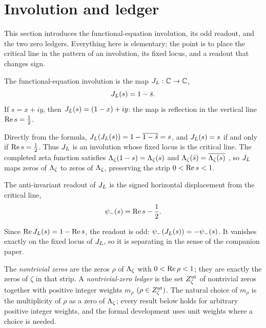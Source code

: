 \section{Involution and ledger}
\label{sec:involution_and_ledger}

This section introduces the functional-equation involution, its odd
readout, and the two zero ledgers.  Everything here is elementary; the
point is to place the critical line in the pattern of an involution,
its fixed locus, and a readout that changes sign.

\begin{definition}
\label{def:rh:fe-involution}
The functional-equation involution is the map
\(J_{L}:\mathbb C\to\mathbb C\),
\[
  J_{L}(s)=1-\bar s .
\]
If \(s=x+iy\), then \(J_{L}(s)=(1-x)+iy\): the map is reflection in the
vertical line \(\operatorname{Re} s=\frac12\).
\end{definition}

Directly from the formula, \(J_{L}(J_{L}(s))=1-\overline{1-\bar s}=s\), and
\(J_{L}(s)=s\) if and only if \(\operatorname{Re} s=\frac12\).  Thus \(J_{L}\) is an
involution whose fixed locus is the critical line.  The completed zeta
function satisfies \(\Lambda_{\zeta}(1-s)=\Lambda_{\zeta}(s)\) and
\(\Lambda_{\zeta}(\bar s)=\overline{\Lambda_{\zeta}(s)}\)
\citep{TitchmarshHeathBrown1986,Edwards1974}, so \(J_{L}\) maps zeros of
\(\Lambda_{\zeta}\) to zeros of \(\Lambda_{\zeta}\), preserving the strip
\(0<\operatorname{Re} s<1\).

\begin{definition}
\label{def:rh:psi-minus-rh}
The anti-invariant readout of \(J_{L}\) is the signed horizontal
displacement from the critical line,
\[
  \psi_{-}(s)=\operatorname{Re} s-\frac12 .
\]
\end{definition}

Since \(\operatorname{Re}J_{L}(s)=1-\operatorname{Re} s\), the readout is odd:
\(\psi_{-}(J_{L}(s))=-\psi_{-}(s)\).  It vanishes exactly on the fixed locus
of \(J_{L}\), so it is separating in the sense of the companion paper.

\begin{definition}
\label{def:rh:nontrivial-zero-ledger}
The \emph{nontrivial zeros} are the zeros \(\rho\) of \(\Lambda_{\zeta}\) with
\(0<\operatorname{Re}\rho<1\); they are exactly the zeros of \(\zeta\) in that
strip.  A \emph{nontrivial-zero ledger} is the set \(Z_{\zeta}^{\mathrm{nt}}\) of
nontrivial zeros together with positive integer weights
\(m_\rho\) \((\rho\in Z_{\zeta}^{\mathrm{nt}})\).  The natural choice of \(m_\rho\) is the
multiplicity of \(\rho\) as a zero of \(\Lambda_{\zeta}\); every result below holds for arbitrary positive integer weights, and the formal development uses
unit weights where a choice is needed.
\end{definition}

